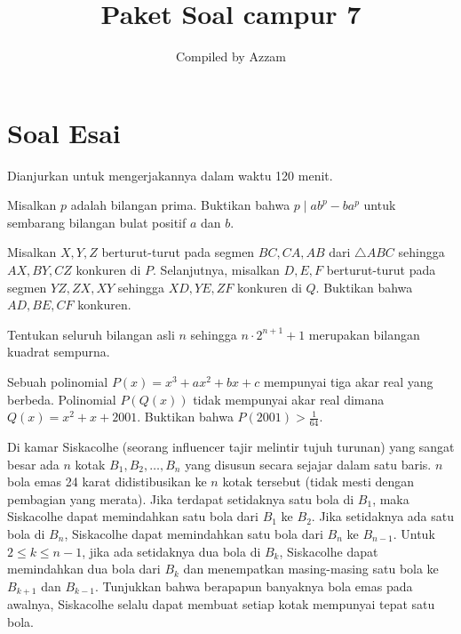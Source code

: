 \documentclass[11pt]{scrartcl}
\begin{document}
	\title{Paket Soal campur 7} %
	\date{}
	\author{Compiled by Azzam}
	\maketitle
	
	
	\section{Soal Esai}
	Dianjurkan untuk mengerjakannya dalam waktu 120 menit.
	\begin{soalbaru} 
			Misalkan $p$ adalah bilangan prima. Buktikan bahwa $p \mid ab^p - ba^p$ untuk sembarang bilangan bulat positif $a$ dan $b$.
		\end{soalbaru}
		
		
		\begin{soalbaru}
				Misalkan $X,Y,Z$ berturut-turut pada segmen $BC,CA,AB$ dari $\triangle ABC$ sehingga $AX, BY, CZ$ konkuren di $P$. Selanjutnya, misalkan $D,E,F$ berturut-turut pada segmen $YZ,ZX,XY$ sehingga $XD,YE,ZF$ konkuren di $Q$. Buktikan bahwa $AD,BE,CF$ konkuren.
			\end{soalbaru}

	\begin{soalbaru}
		Tentukan seluruh bilangan asli $n$ sehingga $n\cdot 2^{n+1}+1$ merupakan bilangan kuadrat sempurna.
	\end{soalbaru}

	\begin{soalbaru}
		Sebuah polinomial $P(x)=x^3+ax^2+bx+c$ mempunyai tiga akar real yang berbeda. Polinomial $P(Q(x))$ tidak mempunyai akar real dimana $Q(x)=x^2+x+2001$. Buktikan bahwa $P(2001)>\frac{1}{64}$.
	\end{soalbaru}

	
	\begin{soalbaru}
	Di kamar Siskacolhe (seorang influencer tajir melintir tujuh turunan) yang sangat besar ada $n$ kotak $B_1,B_2,\dots,B_n$ yang disusun secara sejajar dalam satu baris. $n$ bola emas 24 karat didistibusikan ke $n$ kotak tersebut (tidak mesti dengan pembagian yang merata). Jika terdapat setidaknya satu bola di $B_1$, maka Siskacolhe dapat memindahkan satu bola dari $B_1$ ke $B_2$. Jika setidaknya ada satu bola di $B_n$, Siskacolhe dapat memindahkan satu bola dari $B_n$ ke $B_{n-1}$. Untuk $2 \le k \le n-1$, jika ada setidaknya dua bola di $B_k$, Siskacolhe dapat memindahkan dua bola dari $B_k$ dan menempatkan masing-masing satu bola ke $B_{k+1}$ dan $B_{k-1}$. Tunjukkan bahwa berapapun banyaknya bola emas pada awalnya, Siskacolhe selalu dapat membuat setiap kotak mempunyai tepat satu bola.
	\end{soalbaru}

	
\end{document}
